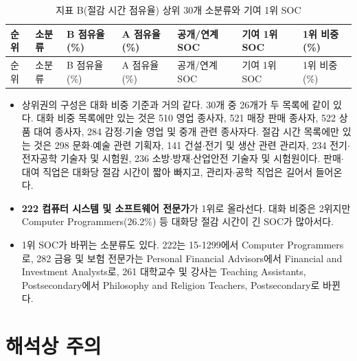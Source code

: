 \documentclass[11pt]{article}
\begin{document}
\begin{longtable}{R{0.6cm}L{4.3cm}R{1.3cm}R{1.0cm}R{1.1cm}L{5.2cm}R{1.0cm}}
\caption{지표 B(절감 시간 점유율) 상위 30개 소분류와 기여 1위 SOC}\label{tab:saved}\\
\toprule
순위 & 소분류 & B 점유율(\%) & A 점유율(\%) & 공개/연계 SOC & 기여 1위 SOC & 1위 비중(\%) \\
\midrule
\endfirsthead
\toprule
순위 & 소분류 & B 점유율(\%) & A 점유율(\%) & 공개/연계 SOC & 기여 1위 SOC & 1위 비중(\%) \\
\midrule
\endhead

\bottomrule
\end{longtable}

\begin{itemize}[leftmargin=*]
  \item 상위권의 구성은 대화 비중 기준과 거의 같다. 30개 중 26개가 두 목록에 같이 있다. 대화 비중 목록에만 있는 것은 510 영업 종사자, 521 매장 판매 종사자, 522 상품 대여 종사자, 284 감정$\cdot$기술 영업 및 중개 관련 종사자다. 절감 시간 목록에만 있는 것은 298 문화$\cdot$예술 관련 기획자, 141 건설$\cdot$전기 및 생산 관련 관리자, 234 전기$\cdot$전자공학 기술자 및 시험원, 236 소방$\cdot$방재$\cdot$산업안전 기술자 및 시험원이다. 판매$\cdot$대여 직업은 대화당 절감 시간이 짧아 빠지고, 관리자$\cdot$공학 직업은 길어서 들어온다.
  \item \textbf{222 컴퓨터 시스템 및 소프트웨어 전문가}가 1위로 올라선다. 대화 비중은 2위지만 Computer Programmers(26.2\%) 등 대화당 절감 시간이 긴 SOC가 많아서다.
  \item 1위 SOC가 바뀌는 소분류도 있다. 222는 15-1299에서 Computer Programmers로, 282 금융 및 보험 전문가는 Personal Financial Advisors에서 Financial and Investment Analysts로, 261 대학교수 및 강사는 Teaching Assistants, Postsecondary에서 Philosophy and Religion Teachers, Postsecondary로 바뀐다.
\end{itemize}

\section{해석상 주의}
\end{document}
